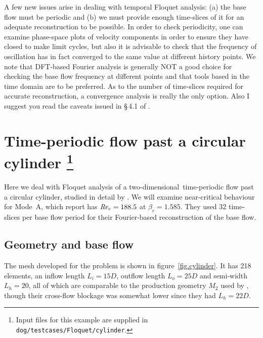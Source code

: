 \documentclass[11pt,a4paper]{report}
\newcommand\Rey{\mbox{\textit{Re}}}
\newcommand\twod{two-di\-men\-sion\-al}
\newcommand{\eg}{e.g.\ }
\begin{document}
A few new issues arise in dealing with temporal Floquet analysis: (a)
the base flow must be periodic and (b) we must provide enough
time-slices of it for an adequate reconstruction to be possible.  In
order to check periodicity, one can examine phase-space plots of
velocity components in order to ensure they have closed to make limit
cycles, but also it is advisable to check that the frequency of
oscillation has in fact converged to the same value at different
history points.  We note that DFT-based Fourier analysis is generally
NOT a good choice for checking the base flow frequency at different
points and that tools based in the time domain \citep[\eg
  zero-crossing analysis, see chapter~8 of][]{newland93} are to be
preferred. As to the number of time-slices required for accurate
reconstruction, a convergence analysis is really the only option.
Also I suggest you read the caveats issued in \S\,4.1 of
\citet{bbs08b}.

\section{Time-periodic flow past a circular cylinder
\protect\footnote{Input files for this example are supplied in
  \texttt{dog/testcases/Floquet/cylinder}.}  }
\label{sec.cyl2d}

Here we deal with Floquet analysis of a \twod\ time-periodic flow past
a circular cylinder, studied in detail by \citet{bah96}.  We will
examine near-critical behaviour for Mode~A, which \citeauthor{bah96}
report has $\Rey_c=188.5$ at $\beta_c=1.585$.  They used 32
time-slices per base flow period for their Fourier-based
reconstruction of the base flow.

\subsection{Geometry and base flow}

The mesh developed for the problem is shown in
figure~\ref{fig.cylinder}.  It has 218 elements, an inflow length
$L_i=15D$, outflow length $L_o=25D$ and semi-width $L_h=20$, all of
which are comparable to the production geometry $M_2$ used by
\citet{bah96}, though their cross-flow blockage was somewhat lower
since they had $L_h=22D$.
\end{document}
